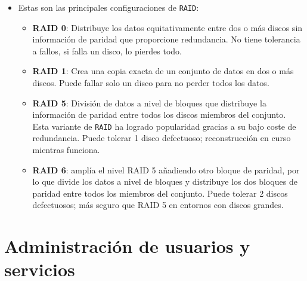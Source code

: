 \documentclass[10pt]{article}
\begin{document}
\begin{itemize}
\begin{itemize}
			\item Estas son las principales configuraciones de \verb|RAID|:
			\begin{itemize}
				\item \textbf{RAID 0}: Distribuye los datos equitativamente entre dos o más discos sin información de paridad que proporcione redundancia. No tiene tolerancia a fallos, si falla un disco, lo pierdes todo.
				\item \textbf{RAID 1}: Crea una copia exacta de un conjunto de datos en dos o más discos. Puede fallar solo un disco para no perder todos los datos.
				\item \textbf{RAID 5}: División de datos a nivel de bloques que distribuye la información de paridad entre todos los discos miembros del conjunto. Esta variante de \verb|RAID| ha logrado popularidad gracias a su bajo coste de redundancia. Puede tolerar 1 disco defectuoso; reconstrucción en curso mientras funciona.
				\item \textbf{RAID 6}: amplía el nivel RAID 5 añadiendo otro bloque de paridad, por lo que divide los datos a nivel de bloques y distribuye los dos bloques de paridad entre todos los miembros del conjunto. Puede tolerar 2 discos defectuosos; más seguro que RAID 5 en entornos con discos grandes.
			\end{itemize}
		\end{itemize}
	\end{itemize}
	
	\clearpage
	
	\section{Administración de usuarios y servicios}
\end{document}
